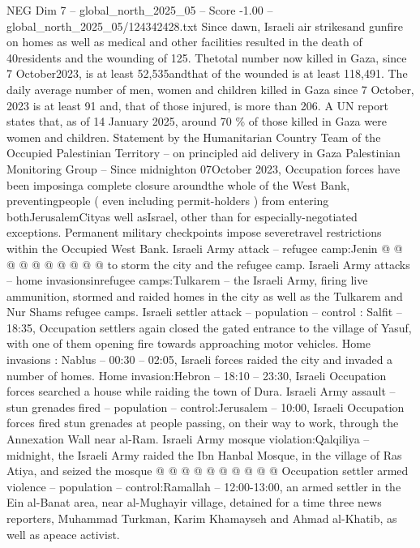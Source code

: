 \begin{textsample}{NEG Dim 7 – global\_north\_2025\_05 – Score -1.00 – global\_north\_2025\_05/124342428.txt}  \label{ex:f7_neg_121}
Since dawn, Israeli air strikesand gunfire on homes as well as medical and other facilities resulted in the death of 40residents and the wounding of 125.
Thetotal number now killed in Gaza, since 7 October2023, is at least 52,535andthat of the wounded is at least 118,491.
The daily average number of men, women and children killed in Gaza since 7 October, 2023 is at least 91 and, that of those injured, is more than 206.
A UN report states that, as of 14 January 2025, around 70 \% of those killed in Gaza were women and children.
Statement by the Humanitarian Country Team of the Occupied Palestinian Territory -- on principled aid delivery in Gaza Palestinian Monitoring Group -- Since midnighton 07October 2023, Occupation forces have been imposinga complete closure aroundthe whole of the West Bank, preventingpeople ( even including permit-holders ) from entering bothJerusalemCityas well asIsrael, other than for especially-negotiated exceptions.
Permanent military checkpoints impose severetravel restrictions within the Occupied West Bank.
Israeli Army attack -- refugee camp:Jenin @ @ @ @ @ @ @ @ @ @ to storm the city and the refugee camp.
Israeli Army attacks -- home invasionsinrefugee camps:Tulkarem -- the Israeli Army, firing live ammunition, stormed and raided homes in the city as well as the Tulkarem and Nur Shams refugee camps.
Israeli settler attack -- population -- control : Salfit -- 18:35, Occupation settlers again closed the gated entrance to the village of Yasuf, with one of them opening fire towards approaching motor vehicles.
Home invasions : Nablus -- 00:30 -- 02:05, Israeli forces raided the city and invaded a number of homes.
Home invasion:Hebron -- 18:10 -- 23:30, Israeli Occupation forces searched a house while raiding the town of Dura.
Israeli Army assault -- stun grenades fired -- population -- control:Jerusalem -- 10:00, Israeli Occupation forces fired stun grenades at people passing, on their way to work, through the Annexation Wall near al-Ram.
Israeli Army mosque violation:Qalqiliya -- midnight, the Israeli Army raided the Ibn Hanbal Mosque, in the village of Ras Atiya, and seized the mosque @ @ @ @ @ @ @ @ @ @ Occupation settler armed violence -- population -- control:Ramallah -- 12:00-13:00, an armed settler in the Ein al-Banat area, near al-Mughayir village, detained for a time three news reporters, Muhammad Turkman, Karim Khamayseh and Ahmad al-Khatib, as well as apeace activist.

\end{textsample}
